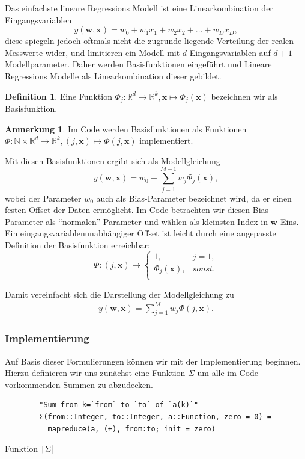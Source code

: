 \documentclass{article}
\theoremstyle{plain} %
\theoremstyle{definition} %
\newtheorem{definition}[theorem]{Definition}
\newtheorem{anno}[theorem]{Anmerkung}
\begin{document}
Das einfachste lineare Regressions Modell ist eine Linearkombination der Eingangsvariablen 
$$
  y(\mathbf{w}, \mathbf{x}) = w_0 + w_1x_1 + w_2x_2 + \hdots + w_Dx_D,
$$
diese spiegeln jedoch oftmals nicht die zugrunde-liegende Verteilung der realen Messwerte wider, und limitieren ein Modell mit $d$ Eingangsvariablen auf $d+1$ Modellparameter. Daher werden Basisfunktionen eingeführt und Lineare Regressions Modelle als Linearkombination dieser gebildet.
\begin{definition}
  Eine Funktion $\Phi_j: \mathbb{R}^d \rightarrow \mathbb{R}^k, \mathbf{x} \mapsto \Phi_j(\mathbf{x})$ bezeichnen wir als Basisfunktion.
\end{definition}
\begin{anno}
  Im Code werden Basisfunktionen als Funktionen $\Phi: \mathbb{N} \times \mathbb{R}^d \rightarrow \mathbb{R}^k, (j, \mathbf{x}) \mapsto \Phi(j, \mathbf{x})$ implementiert.
\end{anno}

Mit diesen Basisfunktionen ergibt sich als Modellgleichung
$$
  y(\mathbf{w}, \mathbf{x}) = w_0 + \sum_{j=1}^{M-1}w_j\Phi_j(\mathbf{x}),
$$
wobei der Parameter $w_0$ auch als Bias-Parameter bezeichnet wird, da er einen festen Offset der Daten ermöglicht. Im Code betrachten wir diesen Bias-Parameter als ``normalen'' Parameter und wählen als kleinsten Index in $\mathbf{w}$ Eins. Ein eingangsvariablenunabhängiger Offset ist leicht durch eine angepasste Definition der Basisfunktion erreichbar:
\[ \Phi: (j, \mathbf{x}) \mapsto
 \left\{
  \begin{array}{ll}
    1,& j=1, \\
    \Phi_j(\mathbf{x}), & sonst. \\  
  \end{array}
\right. \]

Damit vereinfacht sich die Darstellung der Modellgleichung zu
\begin{align}
  y(\mathbf{w}, \mathbf{x}) = \sum_{j=1}^{M}w_j\Phi(j, \mathbf{x}). \label{y}
\end{align}

\subsubsection{Implementierung}
Auf Basis dieser Formulierungen können wir mit der Implementierung beginnen.
Hierzu definieren wir uns zunächst eine Funktion \texttt{$\Sigma$} um alle im Code vorkommenden Summen zu abzudecken.

\begin{listing}[H] %
    \begin{verbatim}
        "Sum from k=`from` to `to` of `a(k)`"
        Σ(from::Integer, to::Integer, a::Function, zero = 0) =
          mapreduce(a, (+), from:to; init = zero)
    \end{verbatim}
    \caption{Funktion \texttt|Σ|}
\end{listing}
\end{document}
